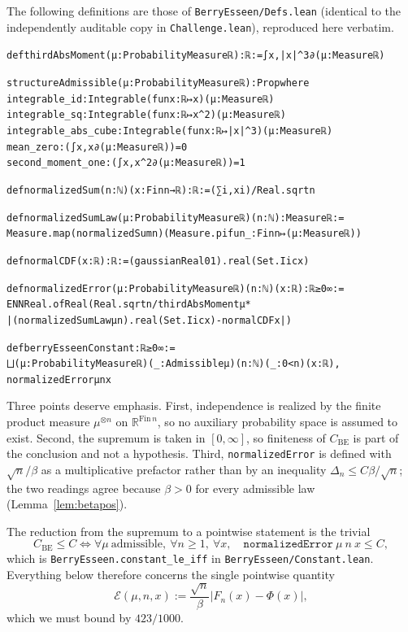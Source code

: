 \documentclass[11pt,a4paper]{article}
\newenvironment{leancode}{\par\smallskip\begin{alltt}\small}{\end{alltt}\smallskip}
\theoremstyle{definition}
\newcommand{\RR}{\mathbb{R}}
\newcommand{\Lean}[1]{\texttt{#1}}
\newcommand{\file}[1]{\texttt{#1}}
\begin{document}
The following definitions are those of \file{BerryEsseen/Defs.lean} (identical
to the independently auditable copy in \file{Challenge.lean}), reproduced here
verbatim.

\begin{leancode}
def thirdAbsMoment (μ : ProbabilityMeasure ℝ) : ℝ := ∫ x, |x| ^ 3 ∂(μ : Measure ℝ)

structure Admissible (μ : ProbabilityMeasure ℝ) : Prop where
  integrable_id : Integrable (fun x : ℝ ↦ x) (μ : Measure ℝ)
  integrable_sq : Integrable (fun x : ℝ ↦ x ^ 2) (μ : Measure ℝ)
  integrable_abs_cube : Integrable (fun x : ℝ ↦ |x| ^ 3) (μ : Measure ℝ)
  mean_zero : (∫ x, x ∂(μ : Measure ℝ)) = 0
  second_moment_one : (∫ x, x ^ 2 ∂(μ : Measure ℝ)) = 1

def normalizedSum (n : ℕ) (x : Fin n → ℝ) : ℝ := (∑ i, x i) / Real.sqrt n

def normalizedSumLaw (μ : ProbabilityMeasure ℝ) (n : ℕ) : Measure ℝ :=
  Measure.map (normalizedSum n) (Measure.pi fun _ : Fin n ↦ (μ : Measure ℝ))

def normalCDF (x : ℝ) : ℝ := (gaussianReal 0 1).real (Set.Iic x)

def normalizedError (μ : ProbabilityMeasure ℝ) (n : ℕ) (x : ℝ) : ℝ≥0∞ :=
  ENNReal.ofReal (Real.sqrt n / thirdAbsMoment μ *
    |(normalizedSumLaw μ n).real (Set.Iic x) - normalCDF x|)

def berryEsseenConstant : ℝ≥0∞ :=
  ⨆ (μ : ProbabilityMeasure ℝ) (_ : Admissible μ) (n : ℕ) (_ : 0 < n) (x : ℝ),
    normalizedError μ n x
\end{leancode}

Three points deserve emphasis. First, independence is realized by the finite
product measure $\mu^{\otimes n}$ on $\RR^{\mathrm{Fin}\,n}$, so no auxiliary
probability space is assumed to exist. Second, the supremum is taken in
$[0,\infty]$, so finiteness of $C_{\mathrm{BE}}$ is part of the conclusion and
not a hypothesis. Third, \Lean{normalizedError} is defined with
$\sqrt n/\beta$ as a multiplicative prefactor rather than by an inequality
$\Delta_n\le C\beta/\sqrt n$; the two readings agree because $\beta>0$ for every
admissible law (Lemma~\ref{lem:betapos}).

The reduction from the supremum to a pointwise statement is the trivial
\begin{equation}
  \label{eq:constant-le-iff}
  C_{\mathrm{BE}}\le C
  \iff
  \forall \mu\ \text{admissible},\ \forall n\ge1,\ \forall x,\quad
  \Lean{normalizedError}\ \mu\ n\ x\le C ,
\end{equation}
which is \Lean{BerryEsseen.constant\_le\_iff} in \file{BerryEsseen/Constant.lean}.
Everything below therefore concerns the single pointwise quantity
\[
  \mathcal E(\mu,n,x):=\frac{\sqrt n}{\beta}\bigl|F_n(x)-\Phi(x)\bigr| ,
\]
which we must bound by $423/1000$.
\end{document}
